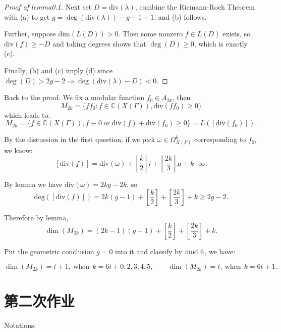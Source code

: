 \begin{enumerate}[1]
\begin{proofc}[解答]
\begin{itemize}
\begin{proof}[Proof of lemma0.1]
         Next set \(D = \text{div}(\lambda)\), 
         combine the Riemann-Roch Theorem with (a) to get 
         \(g = \deg(\text{div}(\lambda)) - g + 1 + 1\), 
         and (b) follows. 
         
         Further, suppose \(\mathrm{dim}(L(D)) > 0\). 
         Then some nonzero \(f \in L(D)\) exists, so \(\text{div}(f) 
         \geq -D\) and taking degrees shows that \(\deg(D) \geq 0\), 
         which is exactly (c).

         Finally, (b) and (c) imply (d) since  \(\deg(D) > 2g - 2 \Rightarrow \deg(\mathrm{div}(\lambda) - D) < 0\). 
        \end{proof}
    



    Back to the proof. We fix a modular function $f_0 \in A_{2k}$, then 
    $$M_{2k} = \{ff_0 : f \in \mathbb{C}(X(\Gamma)), \mathrm{div}(ff_0) \geq 0 \}$$
    which leads to:
    $$M_{2k} = \{f\in \mathbb{C}(X(\Gamma)), f \equiv 0 \ or \ \mathrm{div}(f) + \mathrm{div}(f_0) \geq 0\} = L([\mathrm{div}(f_0)]).$$

    By the discussion in the first question, if we pick $\omega \in \Omega_{X(\Gamma)}^k$ corresponding to $f_0$, we know: 
    $$[ \mathrm{div}(f)] =  \mathrm{div}(\omega) + [\frac{k}{2}] i + [\frac{2k}{3}] \mu + k\cdot \infty.$$

    By lemma we have $ \mathrm{div}(\omega) = 2kg-2k$, so
    $$ \mathrm{deg}([ \mathrm{div}(f)]) = 2k(g-1)+[\frac{k}{2}] + [\frac{2k}{3}] + k \geq 2g-2.$$

    Therefore by lemma, $$\dim (M_{2k}) = (2k-1)(g-1) + [\frac{k}{2}] + [\frac{2k}{3}] + k.$$
        
        Put the geometric conclusion $g = 0$ into it and classify by ${\rm mod}\ 6$, we have:

        $$\dim(M_{2k}) = t+1, \ \text{when} \ \ k = 6t+0,2,3,4,5, \qquad \dim(M_{2k}) = t, \ \text{when} \ \ k = 6t+1.$$
        




        \end{itemize}
    
\end{proofc}

\end{enumerate}


\section{第二次作业}
Notations:

